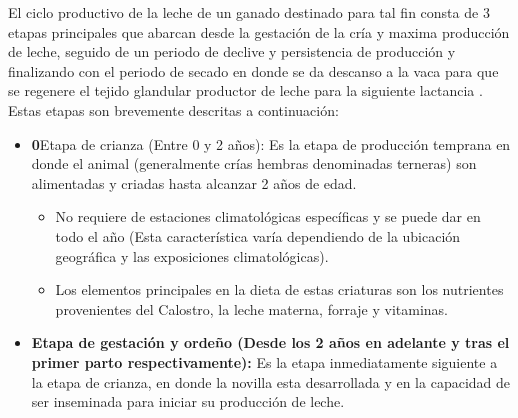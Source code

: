  
El ciclo productivo de la leche de un ganado destinado para tal fin consta de 3 etapas principales que abarcan desde la gestación de la cría y maxima producción de leche, seguido de un periodo de declive y persistencia de producción y finalizando con el periodo de secado en donde se da descanso a la vaca para que se regenere el tejido glandular productor de leche para la siguiente lactancia \cite{mahecha}.\\

Estas etapas son brevemente descritas a continuación:


\begin{itemize}
    \item \textbf0{Etapa de crianza (Entre 0 y 2 años):} Es la etapa de producción temprana en donde el animal (generalmente crías hembras denominadas terneras) son alimentadas y criadas hasta alcanzar 2 años de edad.
	\begin{itemize}
		\item No requiere de estaciones climatológicas específicas y se puede dar en todo el año (Esta característica varía dependiendo de la ubicación geográfica y las exposiciones climatológicas).
		\item Los elementos principales en la dieta de estas criaturas son los nutrientes provenientes del Calostro, la leche materna, forraje y vitaminas.\\
	\end{itemize} 
    \item \textbf{Etapa de gestación y ordeño (Desde los 2 años en adelante y tras el primer parto respectivamente):} Es la etapa inmediatamente siguiente a la etapa de crianza, en donde la novilla esta desarrollada y en la capacidad de ser inseminada para iniciar su producción de leche.
	\begin{itemize}

\end{itemize}
\end{itemize}
